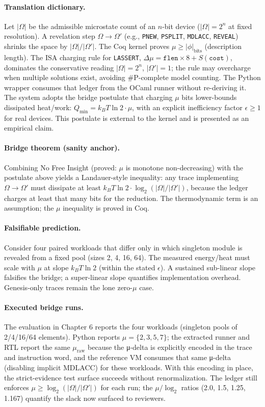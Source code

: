 \paragraph{Translation dictionary.} Let $|\Omega|$ be the admissible microstate count of an $n$-bit device ($|\Omega| = 2^n$ at fixed resolution). A revelation step $\Omega \to \Omega'$ (e.g., \texttt{PNEW}, \texttt{PSPLIT}, \texttt{MDLACC}, \texttt{REVEAL}) shrinks the space by $|\Omega|/|\Omega'|$. The Coq kernel proves $\mu \ge |\phi|_{\text{bits}}$ (description length). The ISA charging rule for \texttt{LASSERT}, $\Delta\mu = \texttt{flen} \times 8 + S(\texttt{cost})$, dominates the conservative reading $|\Omega|=2^n$, $|\Omega'|=1$; the rule may overcharge when multiple solutions exist, avoiding \#P-complete model counting. The Python wrapper consumes that ledger from the OCaml runner without re-deriving it. The system adopts the bridge postulate that charging $\mu$ bits lower-bounds dissipated heat/work: $Q_{\min} = k_B T \ln 2 \cdot \mu$, with an explicit inefficiency factor $\epsilon \ge 1$ for real devices. This postulate is external to the kernel and is presented as an empirical claim.

\paragraph{Bridge theorem (sanity anchor).} Combining No Free Insight (proved: $\mu$ is monotone non-decreasing) with the postulate above yields a Landauer-style inequality: any trace implementing $\Omega \to \Omega'$ must dissipate at least $k_B T \ln 2 \cdot \log_2(|\Omega|/|\Omega'|)$, because the ledger charges at least that many bits for the reduction. The thermodynamic term is an assumption; the $\mu$ inequality is proved in Coq.
\paragraph{Falsifiable prediction.} Consider four paired workloads that differ only in which singleton module is revealed from a fixed pool (sizes 2, 4, 16, 64). The measured energy/heat must scale with $\mu$ at slope $k_B T \ln 2$ (within the stated $\epsilon$). A sustained sub-linear slope falsifies the bridge; a super-linear slope quantifies implementation overhead. Genesis-only traces remain the lone zero-$\mu$ case.
\paragraph{Executed bridge runs.} The evaluation in Chapter 6 reports the four workloads (singleton pools of 2/4/16/64 elements). Python reports $\mu=\{2,3,5,7\}$; the extracted runner and RTL report the same $\mu_{\text{raw}}$ because the μ-delta is explicitly encoded in the trace and instruction word, and the reference VM consumes that same μ-delta (disabling implicit MDLACC) for these workloads. With this encoding in place, the strict-evidence test surface succeeds without renormalization. The ledger still enforces $\mu \ge \log_2(|\Omega|/|\Omega'|)$ for each run; the $\mu/\log_2$ ratios (2.0, 1.5, 1.25, 1.167) quantify the slack now surfaced to reviewers.
